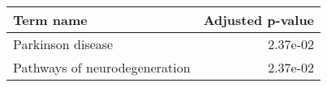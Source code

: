 \begin{tabular}{lr}
\toprule
                    Term name &  Adjusted p-value \\
\midrule
            Parkinson disease &          2.37e-02 \\
Pathways of neurodegeneration &          2.37e-02 \\
\bottomrule
\end{tabular}
